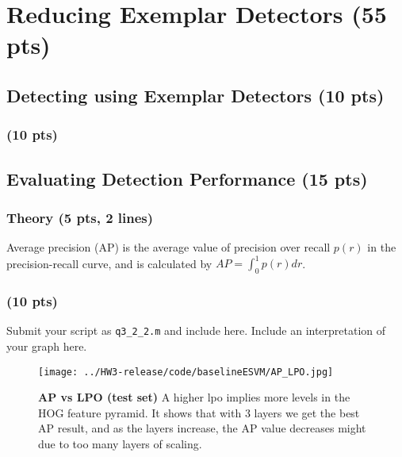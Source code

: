 \documentclass[12pt]{article}
\newcounter{list}
\begin{document}


\section{Reducing Exemplar Detectors (55 pts)}
\label{exemplars}

\subsection{Detecting using Exemplar Detectors (10 pts)}

\subsubsection{(10 pts)}



\subsection{Evaluating Detection Performance (15 pts)}

\subsubsection{Theory (5 pts, 2 lines)}

Average precision (AP) is the average value of precision over recall $p(r)$ in the precision-recall curve, and is calculated by $AP = \int_0^1 p(r)dr$.

\subsubsection{(10 pts)}

Submit your script as \texttt{q3\_2\_2.m} and include here. Include an interpretation of your graph here.

\begin{figure}[H]
  \centering \texttt{[image: ../HW3-release/code/baselineESVM/AP\_LPO.jpg]}
  \caption{{\bf AP vs LPO (test set)} A higher
lpo implies more levels in the HOG feature pyramid. It shows that with 3 layers we get the best AP result, and as the layers increase, the AP value decreases might due to too many layers of scaling.}
  \label{clusters}
\end{figure}


\end{document}
